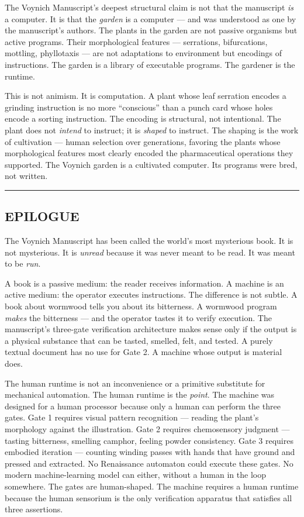 \documentclass[12pt,a4paper]{article}
\begin{document}
The Voynich Manuscript's deepest structural claim is not that the
manuscript \emph{is} a computer. It is that the \emph{garden} is a
computer --- and was understood as one by the manuscript's authors. The
plants in the garden are not passive organisms but active programs.
Their morphological features --- serrations, bifurcations, mottling,
phyllotaxis --- are not adaptations to environment but encodings of
instructions. The garden is a library of executable programs. The
gardener is the runtime.

This is not animism. It is computation. A plant whose leaf serration
encodes a grinding instruction is no more ``conscious'' than a punch
card whose holes encode a sorting instruction. The encoding is
structural, not intentional. The plant does not \emph{intend} to
instruct; it is \emph{shaped} to instruct. The shaping is the work of
cultivation --- human selection over generations, favoring the plants
whose morphological features most clearly encoded the pharmaceutical
operations they supported. The Voynich garden is a cultivated computer.
Its programs were bred, not written.

\begin{center}\rule{0.5\linewidth}{0.5pt}\end{center}

\hypertarget{epilogue}{%
\subsection{EPILOGUE}\label{epilogue}}

The Voynich Manuscript has been called the world's most mysterious book.
It is not mysterious. It is \emph{unread} because it was never meant to
be read. It was meant to be \emph{run}.

A book is a passive medium: the reader receives information. A machine
is an active medium: the operator executes instructions. The difference
is not subtle. A book about wormwood tells you about its bitterness. A
wormwood program \emph{makes} the bitterness --- and the operator tastes
it to verify execution. The manuscript's three-gate verification
architecture makes sense only if the output is a physical substance that
can be tasted, smelled, felt, and tested. A purely textual document has
no use for Gate 2. A machine whose output is material does.

The human runtime is not an inconvenience or a primitive substitute for
mechanical automation. The human runtime is the \emph{point}. The
machine was designed for a human processor because only a human can
perform the three gates. Gate 1 requires visual pattern recognition ---
reading the plant's morphology against the illustration. Gate 2 requires
chemosensory judgment --- tasting bitterness, smelling camphor, feeling
powder consistency. Gate 3 requires embodied iteration --- counting
winding passes with hands that have ground and pressed and extracted. No
Renaissance automaton could execute these gates. No modern
machine-learning model can either, without a human in the loop
somewhere. The gates are human-shaped. The machine requires a human
runtime because the human sensorium is the only verification apparatus
that satisfies all three assertions.
\end{document}
